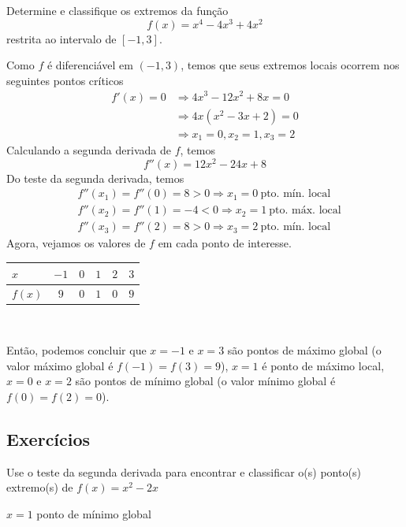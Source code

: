 \cleardoublepage\documentclass[../main.tex]{subfiles}
\begin{document}
\begin{exeresol}
  Determine e classifique os extremos da função
  \begin{equation*}
    f(x) = x^4 - 4x^3 + 4x^2
  \end{equation*}
  restrita ao intervalo de $[-1, 3]$.
\end{exeresol}
\begin{resol}
  Como $f$ é diferenciável em $(-1, 3)$, temos que seus extremos locais ocorrem nos seguintes pontos críticos
  \begin{align*}
    f'(x) = 0 &\Rightarrow 4x^3-12x^2+8x = 0 \\
              &\Rightarrow 4x(x^2-3x+2)=0 \\
              &\Rightarrow x_1 = 0, x_2 = 1, x_3 = 2
  \end{align*}
  Calculando a segunda derivada de $f$, temos
  \begin{equation*}
    f''(x) = 12x^2 - 24x + 8
  \end{equation*}
  Do teste da segunda derivada, temos
  \begin{align*}
    & f''(x_1) = f''(0) = 8 > 0 \Rightarrow x_1=0 ~ \text{pto. mín. local} \\
    & f''(x_2) = f''(1) = -4 < 0 \Rightarrow x_2=1 ~ \text{pto. máx. local} \\
    & f''(x_3) = f''(2) = 8 > 0 \Rightarrow x_3=2 ~ \text{pto. mín. local} 
  \end{align*}
  Agora, vejamos os valores de $f$ em cada ponto de interesse.
  \begin{center}
    \begin{tabular}{l|ccccc}
      $x$     & $-1$ & $0$ & $1$ & $2$ & $3$ \\\hline
      $f(x)$  & $9$    & $0$   & $1$   & $0$ & $9$ \\
    \end{tabular}\\
  \end{center}
  Então, podemos concluir que $x=-1$ e $x=3$ são pontos de máximo global (o valor máximo global é $f(-1)=f(3)=9$), $x=1$ é ponto de máximo local, $x=0$ e $x=2$ são pontos de mínimo global (o valor mínimo global é $f(0)=f(2)=0$).
  
\end{resol}
\subsection{Exercícios}
\begin{exer}
  Use o teste da segunda derivada para encontrar e classificar o(s) ponto(s) extremo(s) de $f(x) = x^2 - 2x$
\end{exer}
\begin{resp}
  $x=1$ ponto de mínimo global
\end{resp}
\end{document}

